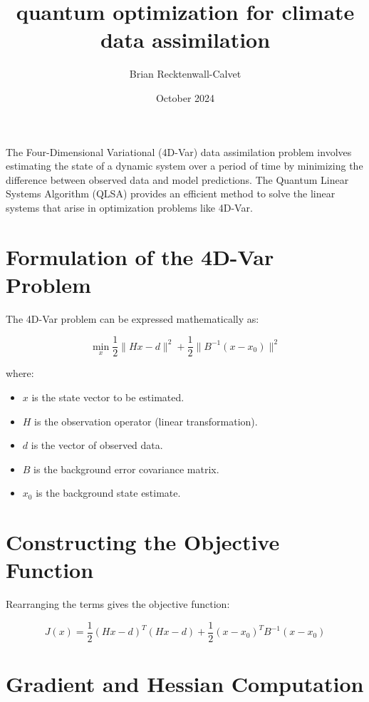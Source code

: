 \documentclass{article}
\title{quantum optimization for climate data assimilation}
\author{Brian Recktenwall-Calvet}
\date{October 2024}
\begin{document}
\maketitle

The Four-Dimensional Variational (4D-Var) data assimilation problem involves estimating the state of a dynamic system over a period of time by minimizing the difference between observed data and model predictions. The Quantum Linear Systems Algorithm (QLSA) provides an efficient method to solve the linear systems that arise in optimization problems like 4D-Var.

\section{Formulation of the 4D-Var Problem}

The 4D-Var problem can be expressed mathematically as:

\begin{equation}
\min_x \frac{1}{2} \| Hx - d \|^2 + \frac{1}{2} \| B^{-1}(x - x_0) \|^2
\end{equation}

where:
\begin{itemize}
    \item \( x \) is the state vector to be estimated.
    \item \( H \) is the observation operator (linear transformation).
    \item \( d \) is the vector of observed data.
    \item \( B \) is the background error covariance matrix.
    \item \( x_0 \) is the background state estimate.
\end{itemize}

\section{Constructing the Objective Function}

Rearranging the terms gives the objective function:

\begin{equation}
J(x) = \frac{1}{2} (Hx - d)^T(Hx - d) + \frac{1}{2} (x - x_0)^T B^{-1} (x - x_0)
\end{equation}

\section{Gradient and Hessian Computation}
\end{document}
